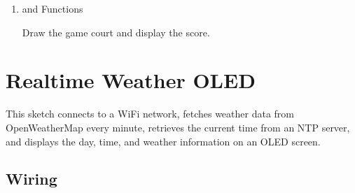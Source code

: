 \documentclass[a4paper,11pt,english]{sphinxmanual}
\begin{document}
\begin{enumerate}
\item {} 
\sphinxAtStartPar
{} and  Functions

\sphinxAtStartPar
Draw the game court and display the score.

\begin{sphinxVerbatim}[commandchars=\\\{\}]

\end{sphinxVerbatim}

\end{enumerate}

\sphinxstepscope


\section{Real\sphinxhyphen{}time Weather OLED}
\label{\detokenize{Extension_Project/Real-time_Weather_OLED:real-time-weather-oled}}\label{\detokenize{Extension_Project/Real-time_Weather_OLED:ext-real-time-weather-oled}}\label{\detokenize{Extension_Project/Real-time_Weather_OLED::doc}}
\sphinxAtStartPar
This sketch connects to a WiFi network, fetches weather data from OpenWeatherMap every minute, retrieves the current time from an NTP server, and displays the day, time, and weather information on an OLED screen.


\subsection{Wiring}
\label{\detokenize{Extension_Project/Real-time_Weather_OLED:wiring}}

\sphinxAtStartPar
{}

\end{document}
